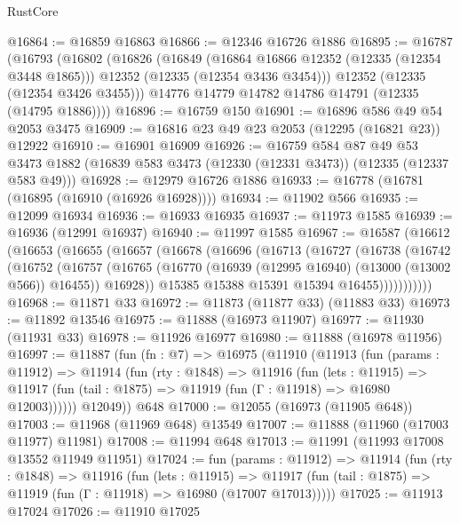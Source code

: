 \begin{lexlean}{RustCore}
\begin{coremodule}
@16864 := @16859 @16863
@16866 := @12346 @16726 @1886
@16895 := @16787
    (@16793
      (@16802
        (@16826
          (@16849
            (@16864 @16866 @12352 (@12335 (@12354 @3448 @1865)))
            @12352
            (@12335 (@12354 @3436 @3454)))
          @12352
          (@12335 (@12354 @3426 @3455)))
        @14776
        @14779
        @14782
        @14786
        @14791
        (@12335 (@14795 @1886))))
@16896 := @16759 @150
@16901 := @16896 @586 @49 @54 @2053 @3475
@16909 := @16816 @23 @49 @23 @2053 (@12295 (@16821 @23)) @12922
@16910 := @16901 @16909
@16926 := @16759
    @584
    @87
    @49
    @53
    @3473
    @1882
    (@16839 @583 @3473 (@12330 (@12331 @3473)) (@12335 (@12337 @583 @49)))
@16928 := @12979 @16726 @1886
@16933 := @16778 (@16781 (@16895 (@16910 (@16926 @16928))))
@16934 := @11902 @566
@16935 := @12099 @16934
@16936 := @16933 @16935
@16937 := @11973 @1585
@16939 := @16936 (@12991 @16937)
@16940 := @11997 @1585
@16967 := @16587
    (@16612
      (@16653
        (@16655
          (@16657
            (@16678
              (@16696
                (@16713
                  (@16727
                    (@16738
                      (@16742
                        (@16752
                          (@16757
                            (@16765
                              (@16770 (@16939 (@12995 @16940) (@13000 (@13002 @566)) @16455))
                              @16928))
                          @15385
                          @15388
                          @15391
                          @15394
                          @16455)))))))))))
@16968 := @11871 @33
@16972 := @11873 (@11877 @33) (@11883 @33)
@16973 := @11892 @13546
@16975 := @11888 (@16973 @11907)
@16977 := @11930 (@11931 @33)
@16978 := @11926 @16977
@16980 := @11888 (@16978 @11956)
@16997 := @11887
    (fun (fn : @7) =>
    @16975
      (@11910
        (@11913
          (fun (params : @11912) =>
          @11914
            (fun (rty : @1848) =>
            @11916
              (fun (lets : @11915) =>
              @11917 (fun (tail : @1875) => @11919 (fun (Γ : @11918) => @16980 @12003))))))
        @12049))
    @648
@17000 := @12055 (@16973 (@11905 @648))
@17003 := @11968 (@11969 @648) @13549
@17007 := @11888 (@11960 (@17003 @11977) @11981)
@17008 := @11994 @648
@17013 := @11991 (@11993 @17008 @13552 @11949 @11951)
@17024 := fun (params : @11912) =>
  @11914
    (fun (rty : @1848) =>
    @11916
      (fun (lets : @11915) =>
      @11917 (fun (tail : @1875) => @11919 (fun (Γ : @11918) => @16980 (@17007 @17013)))))
@17025 := @11913 @17024
@17026 := @11910 @17025

\end{coremodule}
\end{lexlean}
